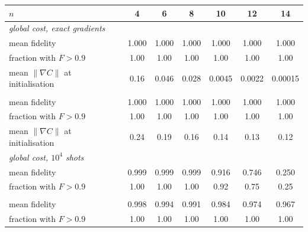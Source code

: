 \begin{tabular}{lcccccc}
\toprule
$n$ & 4 & 6 & 8 & 10 & 12 & 14 \\
\midrule
\multicolumn{7}{l}{\emph{global cost, exact gradients}} \\
\quad mean fidelity & 1.000 & 1.000 & 1.000 & 1.000 & 1.000 & 1.000 \\
\quad fraction with $F>0.9$ & 1.00 & 1.00 & 1.00 & 1.00 & 1.00 & 1.00 \\
\quad mean $\|\nabla C\|$ at initialisation & 0.16 & 0.046 & 0.028 & 0.0045 & 0.0022 & 0.00015 \\
\addlinespace
\multicolumn{7}{l}{\emph{local cost, exact gradients}} \\
\quad mean fidelity & 1.000 & 1.000 & 1.000 & 1.000 & 1.000 & 1.000 \\
\quad fraction with $F>0.9$ & 1.00 & 1.00 & 1.00 & 1.00 & 1.00 & 1.00 \\
\quad mean $\|\nabla C\|$ at initialisation & 0.24 & 0.19 & 0.16 & 0.14 & 0.13 & 0.12 \\
\midrule
\multicolumn{7}{l}{\emph{global cost, $10^4$ shots}} \\
\quad mean fidelity & 0.999 & 0.999 & 0.999 & 0.916 & 0.746 & 0.250 \\
\quad fraction with $F>0.9$ & 1.00 & 1.00 & 1.00 & 0.92 & 0.75 & 0.25 \\
\addlinespace
\multicolumn{7}{l}{\emph{local cost, $10^4$ shots}} \\
\quad mean fidelity & 0.998 & 0.994 & 0.991 & 0.984 & 0.974 & 0.967 \\
\quad fraction with $F>0.9$ & 1.00 & 1.00 & 1.00 & 1.00 & 1.00 & 1.00 \\
\bottomrule
\end{tabular}
